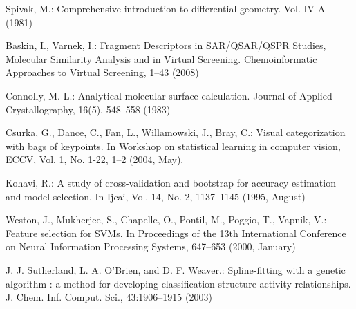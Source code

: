\documentclass{llncs}
\begin{document}
\begin{thebibliography}{16}
Spivak, M.: 
Comprehensive introduction to differential geometry.
Vol. IV A (1981)

Baskin, I., Varnek, I.:
Fragment Descriptors in SAR/QSAR/QSPR Studies, Molecular Similarity Analysis and in Virtual Screening.
Chemoinformatic Approaches to Virtual Screening, 1--43 (2008)

Connolly, M. L.:
Analytical molecular surface calculation. 
Journal of Applied Crystallography, 16(5), 548--558 (1983)

Csurka, G., Dance, C., Fan, L., Willamowski, J., Bray, C.: 
Visual categorization with bags of keypoints. 
In Workshop on statistical learning in computer vision, ECCV, Vol. 1, No. 1-22, 1--2 (2004, May). 

Kohavi, R.:
A study of cross-validation and bootstrap for accuracy estimation and model selection. 
In Ijcai, Vol. 14, No. 2, 1137--1145 (1995, August)

Weston, J., Mukherjee, S., Chapelle, O., Pontil, M., Poggio, T., Vapnik, V.:
Feature selection for SVMs. 
In Proceedings of the 13th International Conference on Neural Information Processing Systems, 647--653 (2000, January)

J. J. Sutherland, L. A. O’Brien, and D. F. Weaver.:
Spline-fitting with a genetic algorithm : a method for developing classification structure-activity relationships.
J. Chem. Inf. Comput. Sci., 43:1906–1915 (2003)

\end{thebibliography}
\end{document}

